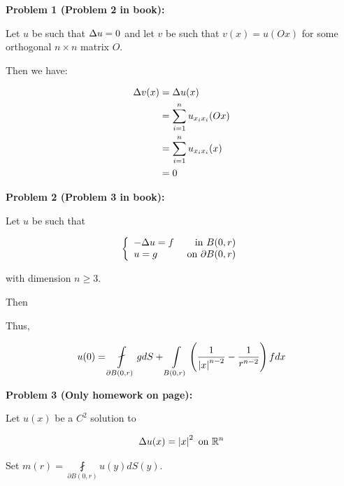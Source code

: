 \documentclass[a4paper,12pt]{article}
\begin{document}
{\bf Problem 1 (Problem 2 in book):}

Let $u$ be such that $\Delta u = 0$ and let $v$ be such that $v(x) = u(Ox)$ for some orthogonal $n\times n$  matrix $O$.

Then we have:

\begin{align*}
\Delta v(x) &= \Delta u(x)\\
&= \sum\limits_{i=1}^n u_{x_ix_i} (Ox)\\
&= \sum\limits_{i=1}^n u_{x_ix_i} (x) \\
&= 0
\end{align*}


\shunt

{\bf Problem 2 (Problem 3 in book):}

Let $u$ be such that 

\begin{displaymath}
   \left\{
     \begin{array}{lr}
       -\Delta u = f & \text{ in } B(0,r)\\
       u=g & \text{ on }\partial B(0,r)
     \end{array}
   \right.
\end{displaymath} 

with dimension $n \geq 3$.

Then %

Thus, 

\begin{displaymath}
u(0) = \fint \limits_{\partial B(0,r)} g dS + \int\limits_{B(0,r)} \left( \frac{1}{\absval{x}^{n-2}} - \frac{1}{r^{n-2}}\right) f dx
\end{displaymath}

\shunt

{\bf Problem 3 (Only homework on page):}

Let $u(x)$ be a $C^2$ solution to 

\begin{align*}
\Delta u(x) = \left\lvert x \right\rvert^2 \text{ on } \mathbb{R}^n
\end{align*}

Set $m(r) = \fint\limits_{\partial B(0,r)} u(y) dS(y)$.


\shunt
\end{document}
